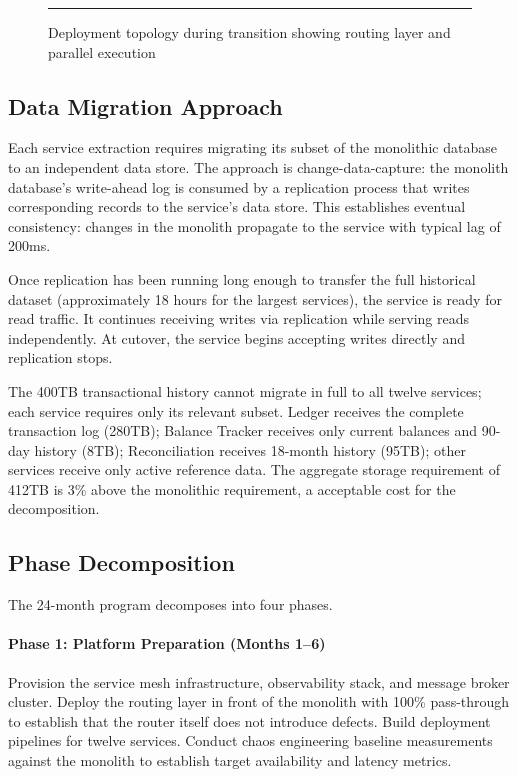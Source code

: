 \begin{figure}[htbp]
\centering
\rule{0.8\textwidth}{0.4\textwidth}
\caption{Deployment topology during transition showing routing layer and parallel execution}
\label{fig:deployment-topology}
\end{figure}

\subsection{Data Migration Approach}

Each service extraction requires migrating its subset of the monolithic database to an independent data store. The approach is change-data-capture: the monolith database's write-ahead log is consumed by a replication process that writes corresponding records to the service's data store. This establishes eventual consistency: changes in the monolith propagate to the service with typical lag of 200ms.

Once replication has been running long enough to transfer the full historical dataset (approximately 18 hours for the largest services), the service is ready for read traffic. It continues receiving writes via replication while serving reads independently. At cutover, the service begins accepting writes directly and replication stops.

The 400TB transactional history cannot migrate in full to all twelve services; each service requires only its relevant subset. Ledger receives the complete transaction log (280TB); Balance Tracker receives only current balances and 90-day history (8TB); Reconciliation receives 18-month history (95TB); other services receive only active reference data. The aggregate storage requirement of 412TB is 3\% above the monolithic requirement, a acceptable cost for the decomposition.

\subsection{Phase Decomposition}

The 24-month program decomposes into four phases.

\paragraph{Phase 1: Platform Preparation (Months 1--6)}
Provision the service mesh infrastructure, observability stack, and message broker cluster. Deploy the routing layer in front of the monolith with 100\% pass-through to establish that the router itself does not introduce defects. Build deployment pipelines for twelve services. Conduct chaos engineering baseline measurements against the monolith to establish target availability and latency metrics.


